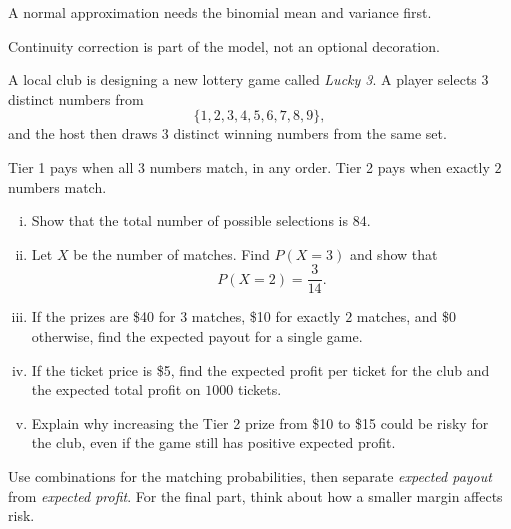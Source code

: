 \begin{takeaways}
\item A normal approximation needs the binomial mean and variance first.
\item Continuity correction is part of the model, not an optional decoration.
\end{takeaways}

\begin{problem}
A local club is designing a new lottery game called \textit{Lucky 3}. A player selects $3$ distinct numbers from
\[
\{1,2,3,4,5,6,7,8,9\},
\]
and the host then draws $3$ distinct winning numbers from the same set.

Tier 1 pays when all $3$ numbers match, in any order. Tier 2 pays when exactly $2$ numbers match.

\begin{enumerate}[(i)]
  \item Show that the total number of possible selections is $84$.
  \item Let $X$ be the number of matches. Find $P(X=3)$ and show that
  \[
  P(X=2)=\frac{3}{14}.
  \]
  \item If the prizes are \$40 for $3$ matches, \$10 for exactly $2$ matches, and \$0 otherwise, find the expected payout for a single game.
  \item If the ticket price is \$5, find the expected profit per ticket for the club and the expected total profit on $1000$ tickets.
  \item Explain why increasing the Tier 2 prize from \$10 to \$15 could be risky for the club, even if the game still has positive expected profit.
\end{enumerate}
\end{problem}

\begin{hint}
Use combinations for the matching probabilities, then separate \emph{expected payout} from \emph{expected profit}. For the final part, think about how a smaller margin affects risk.
\end{hint}

